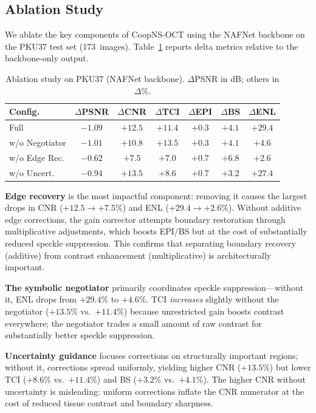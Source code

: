 \documentclass[journal,twoside,web]{ieeecolor}
\begin{document}
\subsection{Ablation Study}
\label{sec:ablation}

We ablate the key components of CoopNS-OCT using the NAFNet backbone on the PKU37 test set (173~images). Table~\ref{tab:ablation} reports delta metrics relative to the backbone-only output.

\begin{table}[t]
\centering
\caption{Ablation study on PKU37 (NAFNet backbone). $\Delta$PSNR in dB; others in $\Delta\%$.}
\label{tab:ablation}
\setlength{\tabcolsep}{2.5pt}
\footnotesize
\begin{tabular}{lcccccc}
\toprule
Config. & $\Delta$PSNR & $\Delta$CNR & $\Delta$TCI & $\Delta$EPI & $\Delta$BS & $\Delta$ENL \\
\midrule
Full & $-1.09$ & $+12.5$ & $+11.4$ & $+0.3$ & $+4.1$ & $+29.4$ \\
w/o Negotiator & $-1.01$ & $+10.8$ & $+13.5$ & $+0.3$ & $+4.1$ & $+4.6$ \\
w/o Edge Rec. & $-0.62$ & $+7.5$ & $+7.0$ & $+0.7$ & $+6.8$ & $+2.6$ \\
w/o Uncert. & $-0.94$ & $+13.5$ & $+8.6$ & $+0.7$ & $+3.2$ & $+27.4$ \\
\bottomrule
\end{tabular}
\end{table}

\textbf{Edge recovery} is the most impactful component: removing it causes the largest drops in CNR ($+12.5 \to +7.5\%$) and ENL ($+29.4 \to +2.6\%$). Without additive edge corrections, the gain corrector attempts boundary restoration through multiplicative adjustments, which boosts EPI/BS but at the cost of substantially reduced speckle suppression. This confirms that separating boundary recovery (additive) from contrast enhancement (multiplicative) is architecturally important.

\textbf{The symbolic negotiator} primarily coordinates speckle suppression---without it, ENL drops from $+29.4\%$ to $+4.6\%$. TCI \emph{increases} slightly without the negotiator ($+13.5\%$ vs.\ $+11.4\%$) because unrestricted gain boosts contrast everywhere; the negotiator trades a small amount of raw contrast for substantially better speckle suppression.

\textbf{Uncertainty guidance} focuses corrections on structurally important regions; without it, corrections spread uniformly, yielding higher CNR ($+13.5\%$) but lower TCI ($+8.6\%$ vs.\ $+11.4\%$) and BS ($+3.2\%$ vs.\ $+4.1\%$). The higher CNR without uncertainty is misleading: uniform corrections inflate the CNR numerator at the cost of reduced tissue contrast and boundary sharpness.
\end{document}
